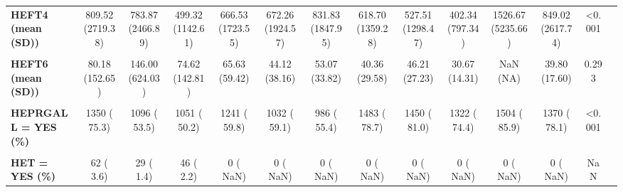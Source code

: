 \documentclass[
]{article}
\begin{document}
\begin{table}[H]
\begin{tabular}[t]{>{\raggedright\arraybackslash}p{5em}ccccccccccccc}
\textbf{HEFT4 (mean (SD))} & 809.52 (2719.38) & 783.87 (2466.89) & 499.32 (1142.61) & 666.53 (1723.55) & 672.26 (1924.57) & 831.83 (1847.95) & 618.70 (1359.28) & 527.51 (1298.47) & 402.34 (797.34) & 1526.67 (5235.66) & 849.02 (2617.74) & <0.001 & \\
\textbf{\cellcolor{gray!10}{HEFT5 (mean (SD))}} & \cellcolor{gray!10}{984.38 (2691.27)} & \cellcolor{gray!10}{942.03 (2488.78)} & \cellcolor{gray!10}{627.43 (1167.37)} & \cellcolor{gray!10}{770.13 (1586.81)} & \cellcolor{gray!10}{794.51 (1936.49)} & \cellcolor{gray!10}{959.09 (1851.50)} & \cellcolor{gray!10}{775.53 (1393.33)} & \cellcolor{gray!10}{709.55 (1348.01)} & \cellcolor{gray!10}{596.78 (876.88)} & \cellcolor{gray!10}{1942.05 (6166.12)} & \cellcolor{gray!10}{1127.69 (2994.96)} & \cellcolor{gray!10}{<0.001} & \cellcolor{gray!10}{}\\
\textbf{HEFT6 (mean (SD))} & 80.18 (152.65) & 146.00 (624.03) & 74.62 (142.81) & 65.63 (59.42) & 44.12 (38.16) & 53.07 (33.82) & 40.36 (29.58) & 46.21 (27.23) & 30.67 (14.31) & NaN (NA) & 39.80 (17.60) & 0.293 & \\
\textbf{\cellcolor{gray!10}{HEFT7 (mean (SD))}} & \cellcolor{gray!10}{110.58 (108.66)} & \cellcolor{gray!10}{237.60 (534.46)} & \cellcolor{gray!10}{199.17 (399.75)} & \cellcolor{gray!10}{146.58 (577.80)} & \cellcolor{gray!10}{97.84 (126.71)} & \cellcolor{gray!10}{97.74 (238.63)} & \cellcolor{gray!10}{88.48 (88.19)} & \cellcolor{gray!10}{79.74 (104.83)} & \cellcolor{gray!10}{67.67 (78.40)} & \cellcolor{gray!10}{139.09 (324.72)} & \cellcolor{gray!10}{116.71 (291.54)} & \cellcolor{gray!10}{<0.001} & \cellcolor{gray!10}{}\\
\textbf{HEPRGALL = YES (\%)} & 1350 ( 75.3) & 1096 ( 53.5) & 1051 ( 50.2) & 1241 ( 59.8) & 1032 ( 59.1) & 986 ( 55.4) & 1483 ( 78.7) & 1450 ( 81.0) & 1322 ( 74.4) & 1504 ( 85.9) & 1370 ( 78.1) & <0.001 & \\
\textbf{\cellcolor{gray!10}{HEPS = YES (\%)}} & \cellcolor{gray!10}{0 (  NaN)} & \cellcolor{gray!10}{0 (  NaN)} & \cellcolor{gray!10}{0 (  NaN)} & \cellcolor{gray!10}{2 (  0.1)} & \cellcolor{gray!10}{6 (  0.3)} & \cellcolor{gray!10}{6 (  0.3)} & \cellcolor{gray!10}{1 (  0.1)} & \cellcolor{gray!10}{1 (  0.1)} & \cellcolor{gray!10}{1 (  0.1)} & \cellcolor{gray!10}{0 (  0.0)} & \cellcolor{gray!10}{1 (  0.1)} & \cellcolor{gray!10}{NaN} & \cellcolor{gray!10}{}\\
\textbf{HET = YES (\%)} & 62 (  3.6) & 29 (  1.4) & 46 (  2.2) & 0 (  NaN) & 0 (  NaN) & 0 (  NaN) & 0 (  NaN) & 0 (  NaN) & 0 (  NaN) & 0 (  NaN) & 0 (  NaN) & NaN & \\

\end{tabular}
\end{table}
\end{document}
